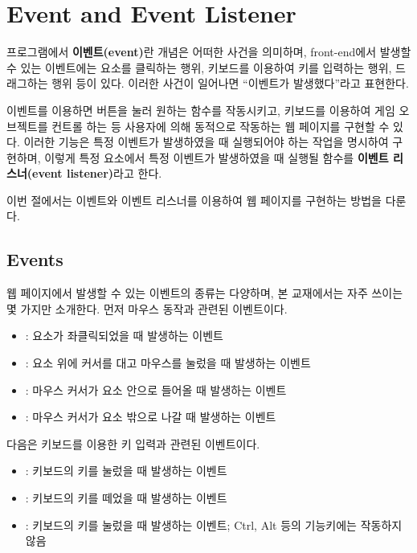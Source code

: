 \section{Event and Event Listener}\label{sect:event-and-event-listener}

프로그램에서 \textbf{이벤트(event)}란 개념은 어떠한 사건을 의미하며, front-end에서 발생할 수 있는 이벤트에는 요소를 클릭하는 행위, 키보드를 이용하여 키를 입력하는 행위, 드래그하는 행위 등이 있다. 이러한 사건이 일어나면 ``이벤트가 발생했다''라고 표현한다.

이벤트를 이용하면 버튼을 눌러 원하는 함수를 작동시키고, 키보드를 이용하여 게임 오브젝트를 컨트롤 하는 등 사용자에 의해 동적으로 작동하는 웹 페이지를 구현할 수 있다. 이러한 기능은 특정 이벤트가 발생하였을 때 실행되어야 하는 작업을 명시하여 구현하며, 이렇게 특정 요소에서 특정 이벤트가 발생하였을 때 실행될 함수를 \textbf{이벤트 리스너(event listener)}라고 한다.

이번 절에서는 이벤트와 이벤트 리스너를 이용하여 웹 페이지를 구현하는 방법을 다룬다.

\subsection*{Events}

웹 페이지에서 발생할 수 있는 이벤트의 종류는 다양하며, 본 교재에서는 자주 쓰이는 몇 가지만 소개한다. 먼저 마우스 동작과 관련된 이벤트이다.

\begin{itemize}
    \item {}: 요소가 좌클릭되었을 때 발생하는 이벤트
    \item {}: 요소 위에 커서를 대고 마우스를 눌렀을 때 발생하는 이벤트
    \item {}: 마우스 커서가 요소 안으로 들어올 때 발생하는 이벤트
    \item {}: 마우스 커서가 요소 밖으로 나갈 때 발생하는 이벤트
\end{itemize}

다음은 키보드를 이용한 키 입력과 관련된 이벤트이다.

\begin{itemize}
    \item {}: 키보드의 키를 눌렀을 때 발생하는 이벤트
    \item {}: 키보드의 키를 떼었을 때 발생하는 이벤트
    \item {}: 키보드의 키를 눌렀을 때 발생하는 이벤트; Ctrl, Alt 등의 기능키에는 작동하지 않음
\end{itemize}

